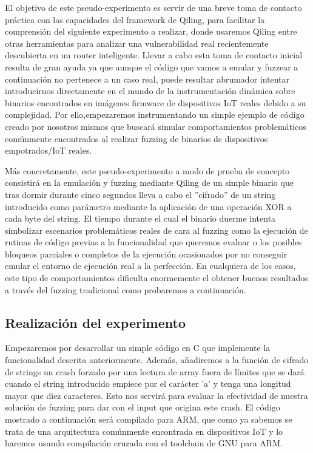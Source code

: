 El objetivo de este pseudo-experimento es servir de una breve toma de contacto práctica con las capacidades del framework de Qiling, para facilitar la comprensión 
del siguiente experimento a realizar, donde usaremos Qiling entre otras herramientas para analizar una vulnerabilidad real recientemente descubierta en un router
inteligente. Llevar a cabo esta toma de contacto inicial resulta de gran ayuda ya que aunque el código que vamos a emular y fuzzear a continuación 
no pertenece a un caso real, puede resultar abrumador intentar introducirnos directamente en el mundo de la instrumentación dinámica sobre binarios encontrados en 
imágenes firmware de dispositivos IoT reales debido a su complejidad. Por ello,empezaremos instrumentando un simple ejemplo de código creado por nosotros mismos que 
buscará simular comportamientos problemáticos comúnmente encontrados al realizar fuzzing de binarios de dispositivos empotrados/IoT reales.\bigskip

Más concretamente, este pseudo-experimento a modo de prueba de concepto consistirá en la emulación y fuzzing mediante Qiling de un simple binario que tras 
dormir durante cinco segundos lleva a cabo el ''cifrado'' de un string introducido como parámetro mediante la aplicación de una operación
XOR a cada byte del string. El tiempo durante el cual el binario duerme intenta simbolizar escenarios problemáticos reales de cara al fuzzing 
como la ejecución de rutinas de código previas a la funcionalidad que queremos evaluar o los posibles bloqueos parciales o completos de la ejecución ocasionados por no conseguir emular el entorno de ejecución real a la perfección. En cualquiera de los casos, este tipo de comportamientos dificulta
enormemente el obtener buenos resultados a través del fuzzing tradicional como probaremos a continuación.

\subsection{Realización del experimento}
Empezaremos por desarrollar un simple código en C que implemente la funcionalidad descrita anteriormente. Además, añadiremos a la función de 
cifrado de strings un crash forzado por una lectura de array fuera de límites que se dará cuando el string introducido empiece por el carácter
'a' y tenga una longitud mayor que diez caracteres. Esto nos servirá para evaluar la efectividad de nuestra solución de fuzzing para dar con 
el input que origina este crash. El código mostrado a continuación será compilado para ARM, que como ya sabemos se trata de una arquitectura 
comúnmente encontrada en dispositivos IoT y lo haremos usando compilación cruzada con el toolchain de GNU para ARM.

